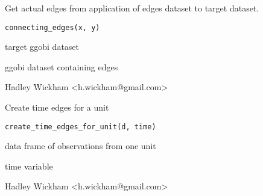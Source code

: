 \documentclass{article}
\begin{document}
\begin{Description}\relax
Get actual edges from application of edges dataset to target dataset.
\end{Description}
\begin{Usage}
\begin{verbatim}connecting_edges(x, y)\end{verbatim}
\end{Usage}
\begin{Arguments}
\begin{ldescription}
\item[\code{x}] target ggobi dataset
\item[\code{y}] ggobi dataset containing edges
\end{ldescription}
\end{Arguments}
\begin{Details}\relax
\end{Details}
\begin{Author}\relax
Hadley Wickham <h.wickham@gmail.com>
\end{Author}
\begin{Examples}
\begin{ExampleCode}\end{ExampleCode}
\end{Examples}

\begin{Description}\relax
Create time edges for a unit
\end{Description}
\begin{Usage}
\begin{verbatim}create_time_edges_for_unit(d, time)\end{verbatim}
\end{Usage}
\begin{Arguments}
\begin{ldescription}
\item[\code{d}] data frame of observations from one unit
\item[\code{time}] time variable
\end{ldescription}
\end{Arguments}
\begin{Details}\relax
\end{Details}
\begin{Author}\relax
Hadley Wickham <h.wickham@gmail.com>
\end{Author}
\begin{Examples}
\begin{ExampleCode}\end{ExampleCode}
\end{Examples}
\end{document}
